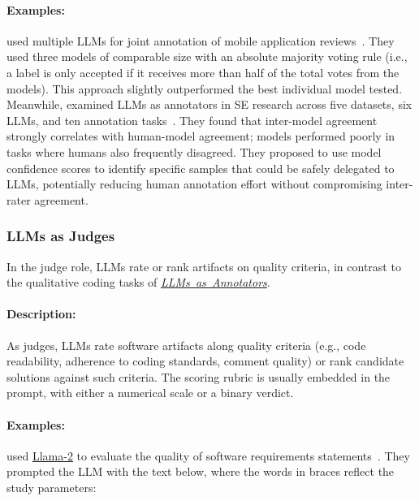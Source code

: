 \documentclass[smallextended]{svjour3}
\newcommand{\annotators}{\hyperref[sec:llms-as-annotators]{\mbox{\emph{LLMs as Annotators}}}\xspace}
\newcommand{\annotators}{\href{/study-types/annotators/}{\emph{LLMs as Annotators}}\xspace}
\newcommand{\studytypesubsection}[1]{\subsubsection{#1}}
\newcommand{\studytypeparagraph}[1]{\paragraph{\bfseries #1:}}
\newcommand{\studytypesubsection}[1]{\subsection{#1}}
\newcommand{\studytypeparagraph}[1]{\subsubsection{#1}}
\begin{document}
\studytypeparagraph{Examples}
\citeauthor{Huang2023Enhancing} used multiple LLMs for joint annotation of mobile application reviews~\cite{Huang2023Enhancing}.
They used three models of comparable size with an absolute majority voting rule (i.e., a label is only accepted if it receives more than half of the total votes from the models). This approach slightly outperformed the best individual model tested. 
Meanwhile, \citeauthor{DBLP:conf/msr/AhmedDTP25} examined LLMs as annotators in SE research across five datasets, six LLMs, and ten annotation tasks~\cite{DBLP:conf/msr/AhmedDTP25}.
They found that inter-model agreement strongly correlates with human-model agreement; models performed poorly in tasks where humans also frequently disagreed. They proposed to use model confidence scores to identify specific samples that could be safely delegated to LLMs, potentially reducing human annotation effort without compromising inter-rater agreement.
\space%

\studytypesubsection{LLMs as Judges}
\label{sec:llms-as-judges}

In the judge role, LLMs rate or rank artifacts on quality criteria, in contrast to the qualitative coding tasks of \annotators.

\studytypeparagraph{Description}

As judges, LLMs rate software artifacts along quality criteria (e.g., code readability, adherence to coding standards, comment quality) or rank candidate solutions against such criteria. The scoring rubric is usually embedded in the prompt, with either a numerical scale or a binary verdict.

\studytypeparagraph{Examples}

\citeauthor{DBLP:conf/re/LubosFTGMEL24} used \href{https://www.llama.com/llama2/}{Llama-2} to evaluate the quality of software requirements statements~\cite{DBLP:conf/re/LubosFTGMEL24}.
They prompted the LLM with the text below, where the words in braces reflect the study parameters:
\end{document}
